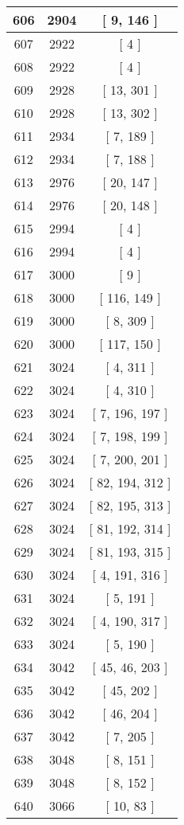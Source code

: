 \begin{center}
\begin{longtable}[H]{|| c c c ||}
\hline
606 & 2904 & [ 9, 146 ] \\ 
\hline
607 & 2922 & [ 4 ] \\ 
\hline
608 & 2922 & [ 4 ] \\ 
\hline
609 & 2928 & [ 13, 301 ] \\ 
\hline
610 & 2928 & [ 13, 302 ] \\ 
\hline
611 & 2934 & [ 7, 189 ] \\ 
\hline
612 & 2934 & [ 7, 188 ] \\ 
\hline
613 & 2976 & [ 20, 147 ] \\ 
\hline
614 & 2976 & [ 20, 148 ] \\ 
\hline
615 & 2994 & [ 4 ] \\ 
\hline
616 & 2994 & [ 4 ] \\ 
\hline
617 & 3000 & [ 9 ] \\ 
\hline
618 & 3000 & [ 116, 149 ] \\ 
\hline
619 & 3000 & [ 8, 309 ] \\ 
\hline
620 & 3000 & [ 117, 150 ] \\ 
\hline
621 & 3024 & [ 4, 311 ] \\ 
\hline
622 & 3024 & [ 4, 310 ] \\ 
\hline
623 & 3024 & [ 7, 196, 197 ] \\ 
\hline
624 & 3024 & [ 7, 198, 199 ] \\ 
\hline
625 & 3024 & [ 7, 200, 201 ] \\ 
\hline
626 & 3024 & [ 82, 194, 312 ] \\ 
\hline
627 & 3024 & [ 82, 195, 313 ] \\ 
\hline
628 & 3024 & [ 81, 192, 314 ] \\ 
\hline
629 & 3024 & [ 81, 193, 315 ] \\ 
\hline
630 & 3024 & [ 4, 191, 316 ] \\ 
\hline
631 & 3024 & [ 5, 191 ] \\ 
\hline
632 & 3024 & [ 4, 190, 317 ] \\ 
\hline
633 & 3024 & [ 5, 190 ] \\ 
\hline
634 & 3042 & [ 45, 46, 203 ] \\ 
\hline
635 & 3042 & [ 45, 202 ] \\ 
\hline
636 & 3042 & [ 46, 204 ] \\ 
\hline
637 & 3042 & [ 7, 205 ] \\ 
\hline
638 & 3048 & [ 8, 151 ] \\ 
\hline
639 & 3048 & [ 8, 152 ] \\ 
\hline
640 & 3066 & [ 10, 83 ] \\ 

\end{longtable}
\end{center}
